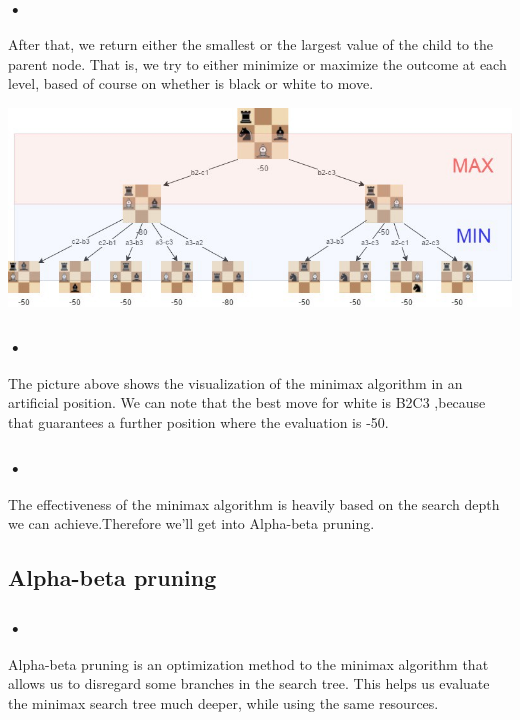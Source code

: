 \documentclass{svproc}
\begin{document}
\subsubsection{•}
After that, we return either the smallest or the largest value of the child to the parent node. That is, we try to either minimize or maximize the outcome at each level, based of course on whether  is black or white to move.

\begin{center}
  \includegraphics[scale=0.4]{minmax}
\end{center}

\subsubsection{•}
The picture above shows the visualization of the minimax algorithm in an artificial position. We can note that the best move for white is B2C3 ,because that guarantees a further position where the evaluation is -50.

\subsubsection{•}
The effectiveness of the minimax algorithm is heavily based on the search depth we can achieve.Therefore we’ll get into Alpha-beta pruning.


\subsection{Alpha-beta pruning}

\subsubsection{•}
Alpha-beta pruning is an optimization method to the minimax algorithm that allows us to disregard some branches in the search tree. This helps us evaluate the minimax search tree much deeper, while using the same resources.
\end{document}
